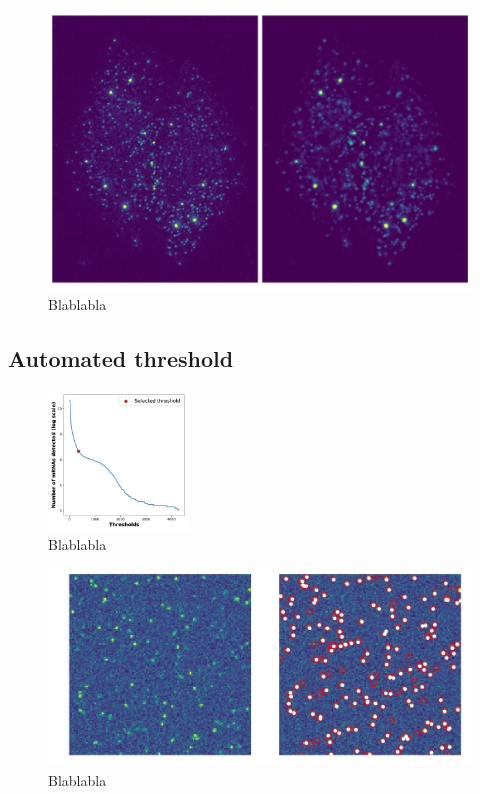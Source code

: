 \begin{figure}[h]
    \centering
    \includegraphics[width=1\textwidth]{figures/chapter2/filter_background}
    \caption{Blablabla}
    \label{fig:filter_remove_background}
\end{figure}

\subsection{Automated threshold}


\begin{figure}
  \begin{center}
    \includegraphics[width=0.33\textwidth]{figures/chapter2/elbow_curve_real}
  \end{center}
  \caption{Blablabla}
  \label{fig:elbow_detection}
\end{figure}


\begin{figure}[h]
    \centering
    \includegraphics[width=1\textwidth]{figures/chapter2/plot_spot_detection}
    \caption{Blablabla}
    \label{fig:testAA}
\end{figure}


